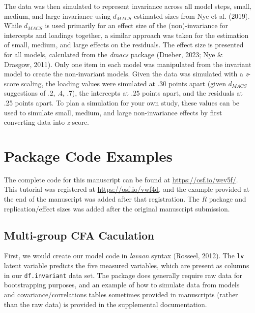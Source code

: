 \documentclass[
  man]{apa7}
\begin{document}
The data was then simulated to represent invariance across all model steps, small, medium, and large invariance using \(d_{MACS}\) estimated sizes from Nye et al. (2019). While \(d_{MACS}\) is used primarily for an effect size of the (non)-invariance for intercepts and loadings together, a similar approach was taken for the estimation of small, medium, and large effects on the residuals. The effect size is presented for all models, calculated from the \emph{dmacs} package (Dueber, 2023; Nye \& Drasgow, 2011). Only one item in each model was manipulated from the invariant model to create the non-invariant models. Given the data was simulated with a \emph{z}-score scaling, the loading values were simulated at .30 points apart (given \(d_{MACS}\) suggestions of .2, .4, .7), the intercepts at .25 points apart, and the residuals at .25 points apart. To plan a simulation for your own study, these values can be used to simulate small, medium, and large non-invariance effects by first converting data into \emph{z}-score.

\hypertarget{package-code-examples}{%
\section{Package Code Examples}\label{package-code-examples}}

The complete code for this manuscript can be found at \url{https://osf.io/wev5f/}. This tutorial was registered at \url{https://osf.io/vwf4d}, and the example provided at the end of the manuscript was added after that registration. The \emph{R} package and replication/effect sizes was added after the original manuscript submission.

\hypertarget{multi-group-cfa-caculation}{%
\subsection{Multi-group CFA Caculation}\label{multi-group-cfa-caculation}}

First, we would create our model code in \emph{lavaan} syntax (Rosseel, 2012). The \texttt{lv} latent variable predicts the five measured variables, which are present as columns in our \texttt{df.invariant} data set. The package does generally require raw data for bootstrapping purposes, and an example of how to simulate data from models and covariance/correlations tables sometimes provided in manuscripts (rather than the raw data) is provided in the supplemental documentation.
\end{document}
